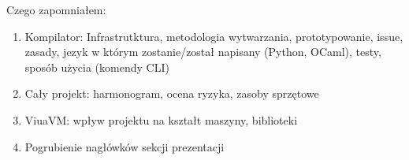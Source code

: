 \documentclass[11pt,oneside,a4paper,twocolumn]{article}
\begin{document}
Czego zapomniałem:
	
\begin{enumerate}
	\item Kompilator: Infrastrutktura, metodologia wytwarzania,  prototypowanie, issue,  zasady, jezyk w którym zostanie/został napisany (Python, OCaml), testy, sposób użycia (komendy CLI)
	\item Cały projekt: harmonogram, ocena ryzyka, zasoby sprzętowe
	\item ViuaVM: wpływ projektu na kształt maszyny, biblioteki		
	\item Pogrubienie nagłówków sekcji prezentacji
\end{enumerate}
\end{document}
